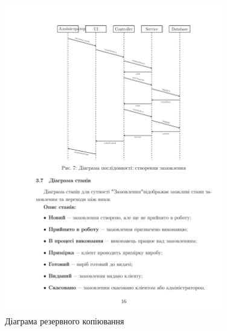 \documentclass[14pt,a4paper]{extarticle}
\begin{document}
\begin{figure}[h!]
\centering
\includegraphics[width=0.85\textwidth]{diagrams/diagram-17.png}
\caption{Діаграма резервного копіювання}
\end{figure}

\newpage
\end{document}
